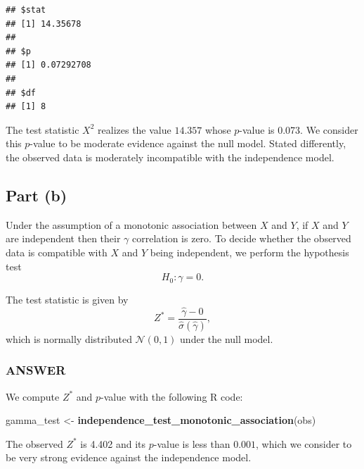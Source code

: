 \documentclass[
]{article}
\newenvironment{Shaded}{\begin{snugshade}}{\end{snugshade}}
\newcommand{\FunctionTok}[1]{\textcolor[rgb]{0.13,0.29,0.53}{\textbf{#1}}}
\newcommand{\NormalTok}[1]{#1}
\newcommand{\OtherTok}[1]{\textcolor[rgb]{0.56,0.35,0.01}{#1}}
\begin{document}
\begin{verbatim}
## $stat
## [1] 14.35678
## 
## $p
## [1] 0.07292708
## 
## $df
## [1] 8
\end{verbatim}

The test statistic \(X^2\) realizes the value \(14.357\) whose
\(p\)-value is 0.073. We consider this \(p\)-value to be moderate
evidence against the null model. Stated differently, the observed data
is moderately incompatible with the independence model.

\hypertarget{part-b-1}{%
\subsection{Part (b)}\label{part-b-1}}


Under the assumption of a monotonic association between \(X\) and \(Y\),
if \(X\) and \(Y\) are independent then their \(\gamma\) correlation is
zero. To decide whether the observed data is compatible with \(X\) and
\(Y\) being independent, we perform the hypothesis test \[
  H_0 : \gamma = 0.
\]

The test statistic is given by \[
  Z^* = \frac{\hat\gamma-0}{\hat\sigma(\hat\gamma)},
\] which is normally distributed \(\mathcal{N}(0,1)\) under the null
model.

\hypertarget{answer-11}{%
\subsubsection{ANSWER}\label{answer-11}}

We compute \(Z^*\) and \(p\)-value with the following R code:

\begin{Shaded}
\begin{Highlighting}[]
\NormalTok{gamma\_test }\OtherTok{\textless{}{-}} \FunctionTok{independence\_test\_monotonic\_association}\NormalTok{(obs)}
\end{Highlighting}
\end{Shaded}

The observed \(Z^*\) is 4.402 and its \(p\)-value is less than
\(0.001\), which we consider to be very strong evidence against the
independence model.
\end{document}
